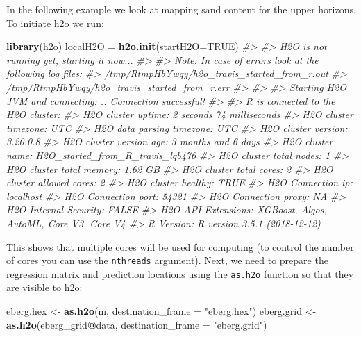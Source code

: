 \documentclass[graybox,natbib,nospthms,UStrade]{svmono}
\newenvironment{Shaded}{\begin{snugshade}}{\end{snugshade}}
\newcommand{\CommentTok}[1]{\textcolor[rgb]{0.37,0.37,0.37}{\textit{#1}}}
\newcommand{\DataTypeTok}[1]{\textcolor[rgb]{0.27,0.27,0.27}{#1}}
\newcommand{\KeywordTok}[1]{\textcolor[rgb]{0.27,0.27,0.27}{\textbf{#1}}}
\newcommand{\NormalTok}[1]{#1}
\newcommand{\OperatorTok}[1]{\textcolor[rgb]{0.43,0.43,0.43}{\textbf{#1}}}
\newcommand{\OtherTok}[1]{\textcolor[rgb]{0.37,0.37,0.37}{#1}}
\newcommand{\StringTok}[1]{\textcolor[rgb]{0.5,0.5,0.5}{#1}}
\begin{document}
In the following example we look at mapping sand content for the upper horizons. To initiate h2o we run:

\begin{Shaded}
\begin{Highlighting}[]
\KeywordTok{library}\NormalTok{(h2o)}
\NormalTok{localH2O =}\StringTok{ }\KeywordTok{h2o.init}\NormalTok{(}\DataTypeTok{startH2O=}\OtherTok{TRUE}\NormalTok{)}
\CommentTok{#> }
\CommentTok{#> H2O is not running yet, starting it now...}
\CommentTok{#> }
\CommentTok{#> Note:  In case of errors look at the following log files:}
\CommentTok{#>     /tmp/RtmpHbYwqy/h2o_travis_started_from_r.out}
\CommentTok{#>     /tmp/RtmpHbYwqy/h2o_travis_started_from_r.err}
\CommentTok{#> }
\CommentTok{#> }
\CommentTok{#> Starting H2O JVM and connecting: .. Connection successful!}
\CommentTok{#> }
\CommentTok{#> R is connected to the H2O cluster: }
\CommentTok{#>     H2O cluster uptime:         2 seconds 74 milliseconds }
\CommentTok{#>     H2O cluster timezone:       UTC }
\CommentTok{#>     H2O data parsing timezone:  UTC }
\CommentTok{#>     H2O cluster version:        3.20.0.8 }
\CommentTok{#>     H2O cluster version age:    3 months and 6 days  }
\CommentTok{#>     H2O cluster name:           H2O_started_from_R_travis_lqb476 }
\CommentTok{#>     H2O cluster total nodes:    1 }
\CommentTok{#>     H2O cluster total memory:   1.62 GB }
\CommentTok{#>     H2O cluster total cores:    2 }
\CommentTok{#>     H2O cluster allowed cores:  2 }
\CommentTok{#>     H2O cluster healthy:        TRUE }
\CommentTok{#>     H2O Connection ip:          localhost }
\CommentTok{#>     H2O Connection port:        54321 }
\CommentTok{#>     H2O Connection proxy:       NA }
\CommentTok{#>     H2O Internal Security:      FALSE }
\CommentTok{#>     H2O API Extensions:         XGBoost, Algos, AutoML, Core V3, Core V4 }
\CommentTok{#>     R Version:                  R version 3.5.1 (2018-12-12)}
\end{Highlighting}
\end{Shaded}

This shows that multiple cores will be used for computing (to control the number of cores you can use the \texttt{nthreads} argument). Next, we need to prepare the regression matrix and prediction locations using the \texttt{as.h2o} function so that they are visible to h2o:

\begin{Shaded}
\begin{Highlighting}[]
\NormalTok{eberg.hex <-}\StringTok{ }\KeywordTok{as.h2o}\NormalTok{(m, }\DataTypeTok{destination_frame =} \StringTok{"eberg.hex"}\NormalTok{)}
\NormalTok{eberg.grid <-}\StringTok{ }\KeywordTok{as.h2o}\NormalTok{(eberg_grid}\OperatorTok{@}\NormalTok{data, }\DataTypeTok{destination_frame =} \StringTok{"eberg.grid"}\NormalTok{)}
\end{Highlighting}
\end{Shaded}
\end{document}
